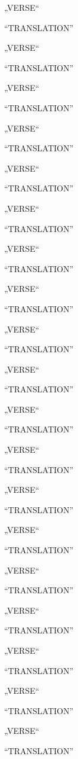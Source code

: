 \bva „VERSE“\eva

\bvb “TRANSLATION”\evb
\evg


\bva „VERSE“\eva

\bvb “TRANSLATION”\evb
\evg


\bva „VERSE“\eva

\bvb “TRANSLATION”\evb
\evg


\bva „VERSE“\eva

\bvb “TRANSLATION”\evb
\evg


\bva „VERSE“\eva

\bvb “TRANSLATION”\evb
\evg


\bva „VERSE“\eva

\bvb “TRANSLATION”\evb
\evg


\bva „VERSE“\eva

\bvb “TRANSLATION”\evb
\evg


\bva „VERSE“\eva

\bvb “TRANSLATION”\evb
\evg


\bva „VERSE“\eva

\bvb “TRANSLATION”\evb
\evg


\bva „VERSE“\eva

\bvb “TRANSLATION”\evb
\evg


\bva „VERSE“\eva

\bvb “TRANSLATION”\evb
\evg


\bva „VERSE“\eva

\bvb “TRANSLATION”\evb
\evg


\bva „VERSE“\eva

\bvb “TRANSLATION”\evb
\evg


\bva „VERSE“\eva

\bvb “TRANSLATION”\evb
\evg


\bva „VERSE“\eva

\bvb “TRANSLATION”\evb
\evg


\bva „VERSE“\eva

\bvb “TRANSLATION”\evb
\evg


\bva „VERSE“\eva

\bvb “TRANSLATION”\evb
\evg


\bva „VERSE“\eva

\bvb “TRANSLATION”\evb
\evg


\bva „VERSE“\eva

\bvb “TRANSLATION”\evb
\evg
